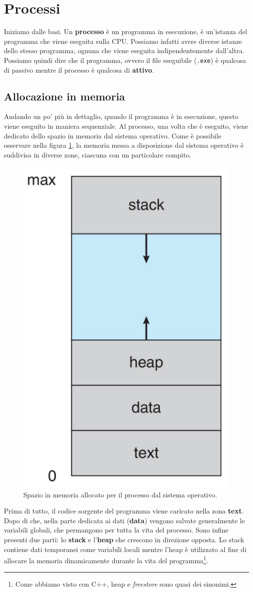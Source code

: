 \section{Processi}\label{processes}
Iniziamo dalle basi. Un \textbf{processo} è un programma in esecuzione, è un'istanza del programma che viene eseguita sulla CPU. Possiamo infatti avere diverse istanze dello stesso programma, ognuna che viene eseguita indipendentemente dall'altra. Possiamo quindi dire che il programma, ovvero il file eseguibile (\texttt{.exe}) è qualcosa di passivo mentre il processo è qualcosa di \textbf{attivo}.

% 
\subsection{Allocazione in memoria}
Andando un po' più in dettaglio, quando il programma è in esecuzione, questo viene eseguito in maniera sequenziale. Al processo, una volta che è eseguito, viene dedicato dello spazio in memoria dal sistema operativo. Come è possibile osservare nella figura \ref{fig:memory_layout}, la memoria messa a disposizione dal sistema operativo è suddivisa in diverse zone, ciascuna con un particolare compito.
\begin{figure}[h]
    \centering
    \includegraphics[width = .2\textwidth]{../res/imgs/processes/memory_layout.png}
    \caption{Spazio in memoria allocato per il processo dal sistema operativo.}
    \label{fig:memory_layout}
\end{figure}
Prima di tutto, il codice sorgente del programma viene caricato nella zona \textbf{text}. Dopo di che, nella parte dedicata ai dati (\textbf{data}) vengono salvate generalmente le variabili globali, che permangono per tutta la vita del processo. Sono infine presenti due parti: lo \textbf{stack} e l'\textbf{heap} che crescono in direzione opposta. Lo stack contiene dati temporanei come variabili locali mentre l'heap è utilizzato al fine di allocare la memoria dinamicamente durante la vita del programma\footnote{Come abbiamo visto con C++, heap e \textit{freestore} sono quasi dei sinonimi.}.


